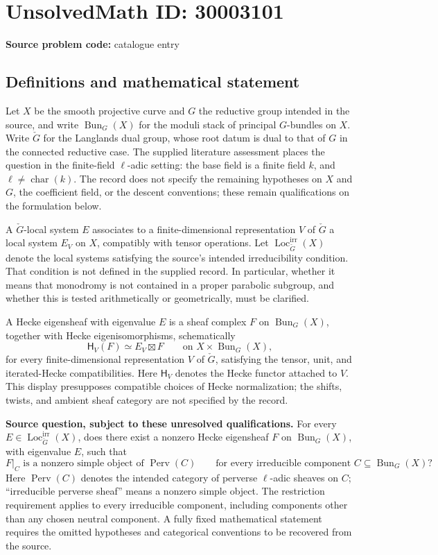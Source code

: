 \documentclass[11pt]{article}
\begin{document}
\section*{UnsolvedMath ID: 30003101}
\textbf{Source problem code:} catalogue entry
\subsection{Definitions and mathematical statement}
Let \(X\) be the smooth projective curve and \(G\) the reductive group intended in the source, and write \(\operatorname{Bun}_G(X)\) for the moduli stack of principal \(G\)-bundles on \(X\). Write \(\check G\) for the Langlands dual group, whose root datum is dual to that of \(G\) in the connected reductive case. The supplied literature assessment places the question in the finite-field \(\ell\)-adic setting: the base field is a finite field \(k\), and \(\ell\ne\operatorname{char}(k)\). The record does not specify the remaining hypotheses on \(X\) and \(G\), the coefficient field, or the descent conventions; these remain qualifications on the formulation below.

A \(\check G\)-local system \(E\) associates to a finite-dimensional representation \(V\) of \(\check G\) a local system \(E_V\) on \(X\), compatibly with tensor operations. Let \(\operatorname{Loc}_{\check G}^{\mathrm{irr}}(X)\) denote the local systems satisfying the source's intended irreducibility condition. That condition is not defined in the supplied record. In particular, whether it means that monodromy is not contained in a proper parabolic subgroup, and whether this is tested arithmetically or geometrically, must be clarified.

A Hecke eigensheaf with eigenvalue \(E\) is a sheaf complex \(F\) on \(\operatorname{Bun}_G(X)\), together with Hecke eigenisomorphisms, schematically
\[
\mathsf H_V(F)\simeq E_V\boxtimes F
\qquad\text{on }X\times\operatorname{Bun}_G(X),
\]
for every finite-dimensional representation \(V\) of \(\check G\), satisfying the tensor, unit, and iterated-Hecke compatibilities. Here \(\mathsf H_V\) denotes the Hecke functor attached to \(V\). This display presupposes compatible choices of Hecke normalization; the shifts, twists, and ambient sheaf category are not specified by the record.

\textbf{Source question, subject to these unresolved qualifications.} For every
\(E\in\operatorname{Loc}_{\check G}^{\mathrm{irr}}(X)\), does there exist a nonzero Hecke eigensheaf \(F\) on \(\operatorname{Bun}_G(X)\), with eigenvalue \(E\), such that
\[
\left.F\right|_C\text{ is a nonzero simple object of }\operatorname{Perv}(C)
\qquad\text{for every irreducible component }C\subseteq\operatorname{Bun}_G(X)?
\]
Here \(\operatorname{Perv}(C)\) denotes the intended category of perverse \(\ell\)-adic sheaves on \(C\); ``irreducible perverse sheaf'' means a nonzero simple object. The restriction requirement applies to every irreducible component, including components other than any chosen neutral component. A fully fixed mathematical statement requires the omitted hypotheses and categorical conventions to be recovered from the source.
\end{document}
